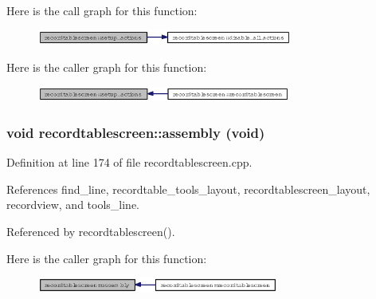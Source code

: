 Here is the call graph for this function:\begin{figure}[H]
\begin{center}
\leavevmode
\includegraphics[width=238pt]{classrecordtablescreen_4e8f0ecaef3b8ea55c68ec06386b84ce_cgraph}
\end{center}
\end{figure}


Here is the caller graph for this function:\begin{figure}[H]
\begin{center}
\leavevmode
\includegraphics[width=236pt]{classrecordtablescreen_4e8f0ecaef3b8ea55c68ec06386b84ce_icgraph}
\end{center}
\end{figure}
\subsubsection{\setlength{\rightskip}{0pt plus 5cm}void recordtablescreen::assembly (void)\hspace{0.3cm}{\tt  [private]}}\label{classrecordtablescreen_ed6b3c5241560d8599f657586fe32b2b}




Definition at line 174 of file recordtablescreen.cpp.

References find\_\-line, recordtable\_\-tools\_\-layout, recordtablescreen\_\-layout, recordview, and tools\_\-line.

Referenced by recordtablescreen().

Here is the caller graph for this function:\begin{figure}[H]
\begin{center}
\leavevmode
\includegraphics[width=225pt]{classrecordtablescreen_ed6b3c5241560d8599f657586fe32b2b_icgraph}
\end{center}
\end{figure}
